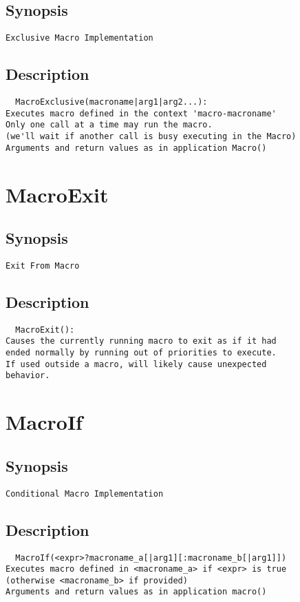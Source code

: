 \subsection{Synopsis}
\begin{verbatim}
Exclusive Macro Implementation
\end{verbatim}
\subsection{Description}
\begin{verbatim}
  MacroExclusive(macroname|arg1|arg2...):
Executes macro defined in the context 'macro-macroname'
Only one call at a time may run the macro.
(we'll wait if another call is busy executing in the Macro)
Arguments and return values as in application Macro()

\end{verbatim}


\section{MacroExit}
\subsection{Synopsis}
\begin{verbatim}
Exit From Macro
\end{verbatim}
\subsection{Description}
\begin{verbatim}
  MacroExit():
Causes the currently running macro to exit as if it had
ended normally by running out of priorities to execute.
If used outside a macro, will likely cause unexpected
behavior.

\end{verbatim}


\section{MacroIf}
\subsection{Synopsis}
\begin{verbatim}
Conditional Macro Implementation
\end{verbatim}
\subsection{Description}
\begin{verbatim}
  MacroIf(<expr>?macroname_a[|arg1][:macroname_b[|arg1]])
Executes macro defined in <macroname_a> if <expr> is true
(otherwise <macroname_b> if provided)
Arguments and return values as in application macro()

\end{verbatim}


